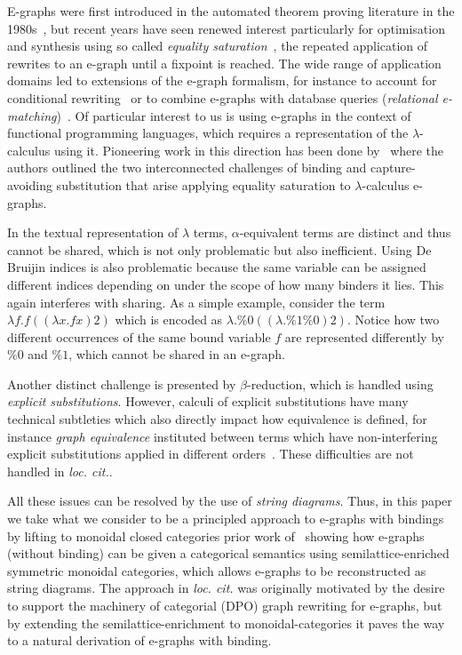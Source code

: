 \documentclass[]{IEEEtran}
\begin{document}
E-graphs were first introduced in the automated theorem proving literature in the 1980s~\cite{nelson1980techniques}, but recent years have seen renewed interest particularly for optimisation and synthesis using so called \emph{equality saturation}~\cite{10.1145/1594834.1480915, griggio_proceedings_2022, EggPaper,flatt_small_2022}, the repeated application of rewrites to an e-graph until a fixpoint is reached. 
The wide range of application domains led to extensions of the e-graph formalism, for instance to account for conditional rewriting~\cite{singher2023colored} or  to combine e-graphs with database queries (\emph{relational e-matching})~\cite{zhang_relational_2022}.
Of particular interest to us is using e-graphs in the context of functional programming languages, which requires a representation of the $\lambda$-calculus using it. 
Pioneering work in this direction has been done by~\cite{koehler2022sketchguided} where
the authors outlined the two interconnected challenges of binding and capture-avoiding substitution that arise applying equality saturation to $\lambda$-calculus e-graphs.

In the textual representation of $\lambda$ terms, $\alpha$-equivalent terms are distinct and thus cannot be shared, which is not only problematic but also inefficient. 
Using De Bruijin indices is also problematic because the same variable can be assigned different indices depending on under the scope of how many binders it lies. 
This again interferes with sharing. 
As a simple example, consider the term $\lambda f . f ((\lambda x . f x) 2)$ which is encoded as $\lambda . \%0 ((\lambda . \%1 \%0) 2)$.
Notice how two different occurrences of the same bound variable $f$ are represented differently by $\%0$ and $\%1$, which cannot be shared in an e-graph.

Another distinct challenge is presented by $\beta$-reduction, which is handled using \emph{explicit substitutions}. 
However, calculi of explicit substitutions have many technical subtleties which also directly impact how equivalence is defined, for instance \emph{graph equivalence} instituted between terms which have non-interfering explicit substitutions applied in different orders~\cite{accattoli2014nonstandard}. 
These difficulties are not handled in \emph{loc. cit.}.

All these issues can be resolved by the use of \emph{string diagrams}.
Thus, in this paper we take what we consider to be a principled approach to e-graphs with bindings by lifting to monoidal closed categories prior work of~\cite{ghica2024equivalencehypergraphsegraphsmonoidal} showing how e-graphs (without binding) can be given a categorical semantics using semilattice-enriched symmetric monoidal categories, which allows e-graphs to be reconstructed as string diagrams.
The approach in \emph{loc. cit.} was originally motivated by the desire to support the machinery of categorial (DPO) graph rewriting for e-graphs, but by extending the semilattice-enrichment to monoidal-categories it paves the way to a natural derivation of e-graphs with binding.
\end{document}
